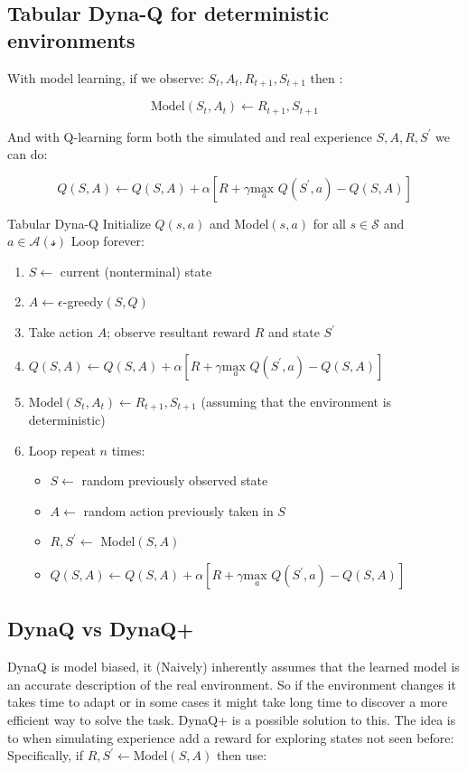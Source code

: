  \subsection*{Tabular Dyna-Q for deterministic environments}
 With model learning, if we observe: $S_t, A_t, R_{t+1}, S_{t+1}$ then :

 	\begin{equation}
 		\text{Model}(S_t,A_t) \leftarrow R_{t+1}, S_{t+1}
 	\end{equation}
 
And with Q-learning form both the simulated and real experience $S,A,R,S^{\prime}$ we can do:

	\begin{equation}
		Q(S,A) \leftarrow Q(S,A) + \alpha[R + \gamma \underset{a}{\text{max }} Q(S^{\prime},a)-Q(S,A)]
	\end{equation}

\begin{wbox}{Tabular Dyna-Q}
Initialize $Q(s,a)$ and Model$(s,a)$ for all $s \in \mathcal{S}$ and $a \in \mathcal{A(s)}$	 
Loop forever:
	\begin{enumerate}
		\item $S \leftarrow$ current (nonterminal) state
		\item $A \leftarrow \epsilon$-greedy$(S,Q)$
		\item Take action $A$; observe resultant reward $R$ and state $S^{\prime}$
		\item $Q(S,A) \leftarrow Q(S,A) + \alpha[R + \gamma \underset{a}{\text{max }} Q(S^{\prime},a)-Q(S,A)]$ 
		\item $\text{Model}(S_t,A_t) \leftarrow R_{t+1}, S_{t+1}$ (assuming that the environment is deterministic)
		\item Loop repeat $n$ times:
		\begin{itemize}
			\item $S \leftarrow$ random previously observed state
			\item $A \leftarrow$ random action previously taken in $S$
			\item $R,S^{\prime} \leftarrow $ Model$(S,A)$
			\item $Q(S,A) \leftarrow Q(S,A) + \alpha[R + \gamma \underset{a}{\text{max }} Q(S^{\prime},a)-Q(S,A)]$ 
		\end{itemize}
	\end{enumerate}
\end{wbox}


\subsection*{DynaQ vs DynaQ+}
DynaQ is model biased, it (Naively) inherently assumes that the learned model is an accurate description of the real environment. So if the environment changes it takes time to adapt or in some cases it might take long time to discover a more efficient way to solve the task. DynaQ+ is a possible solution to this. The idea is to when simulating experience add a reward for exploring states not seen before: Specifically, if $R, S^{\prime} \leftarrow \text{Model}(S,A)$ then use:

